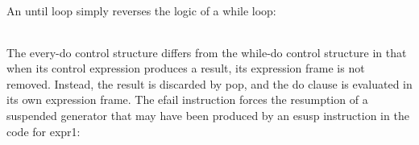 An until loop simply reverses the logic of a while loop:

\begin{center}
\tablelasttail{\hline}
\begin{xtabular}{|m{1.9073598in}|m{2.75596in}|}

\end{xtabular}
\end{center}

The every-do control structure differs from the while-do control
structure in that when its control expression produces a result, its
expression frame is not removed. Instead, the result is discarded by
pop, and the do clause is evaluated in its own expression frame. The
efail instruction forces the resumption of a suspended generator that
may have been produced by an esusp instruction in the code for expr1:

\begin{center}
\tablelasttail{\hline}
\begin{xtabular}{|m{1.9073598in}|m{2.75596in}|}

\end{xtabular}
\end{center}


